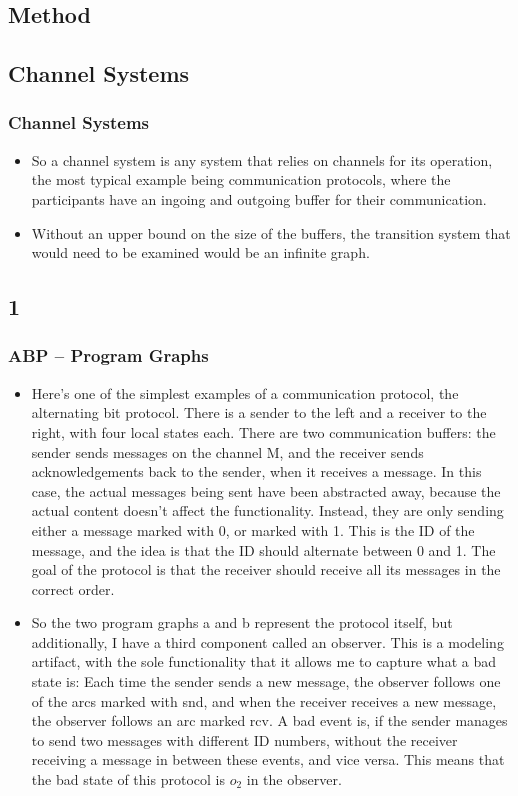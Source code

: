 \documentclass[handout]{beamer}
\begin{document}
\begin{footnotesize}
\section{Method}
\subsection{Channel Systems}
\begin{frame}
  \frametitle{Channel Systems}
  \begin{itemize}
  \item
So a channel system is any system that relies on channels for its operation, the most typical example being communication protocols, where the participants have an ingoing and outgoing buffer for their communication.
\item
Without an upper bound on the size of the buffers, the transition system that would need to be examined would be an infinite graph.
    \end{itemize}
\end{frame}

\subsection*{1}
\begin{frame}
\frametitle{ABP -- Program Graphs}
\begin{itemize}
\item
Here's one of the simplest examples of a communication protocol, the alternating bit protocol. There is a sender to the left and a receiver to the right, with four local states each. There are two communication buffers: the sender sends messages on the channel M, and the receiver sends acknowledgements back to the sender, when it receives a message. In this case, the actual messages being sent have been abstracted away, because the actual content doesn't affect the functionality. Instead, they are only sending either a message marked with 0, or marked with 1. This is the ID of the message, and the idea is that the ID should alternate between 0 and 1. The goal of the protocol is that the receiver should receive all its messages in the correct order.
\item
So the two program graphs a and b represent the protocol itself, but additionally, I have a third component called an observer. This is a modeling artifact, with the sole functionality that it allows me to capture what a bad state is: Each time the sender sends a new message, the observer follows one of the arcs marked with snd, and when the receiver receives a new message, the observer follows an arc marked rcv. A bad event is, if the sender manages to send two messages with different ID numbers, without the receiver receiving a message in between these events, and vice versa. This means that the bad state of this protocol is $o_2$ in the observer.
\end{itemize}
\end{frame}


\end{footnotesize}
\end{document}

